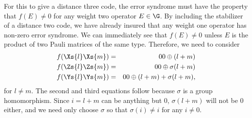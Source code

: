 For this to give a distance three code, the error syndrome must have the
property that $f(E) \neq 0$ for any weight two operator $E \in \G$.  By
including the stabilizer of a distance two code, we have already insured that
any weight one operator has non-zero error syndrome.  We can immediately
see that $f(E) \neq 0$ unless $E$ is the product of two Pauli
matrices of the same type.  Therefore, we need to consider
\begin{eqnarray}
	f(\Xs{l} \Xs{m}) & = & 00 \oplus (l+m) \\
	f(\Zs{l} \Zs{m}) & = & 00 \oplus \sigma (l+m) \\
	f(\Ys{l} \Ys{m}) & = & 00 \oplus (l+m) + \sigma (l+m),
\end{eqnarray}
for $l \neq m$.  The second and third equations follow because
$\sigma$ is a group homomorphism.  Since $i = l+m$ can be anything but $0$,
$\sigma (l+m)$ will not be $0$ either, and we need only choose $\sigma$
so that $\sigma (i) \neq i$ for any $i \neq 0$.

